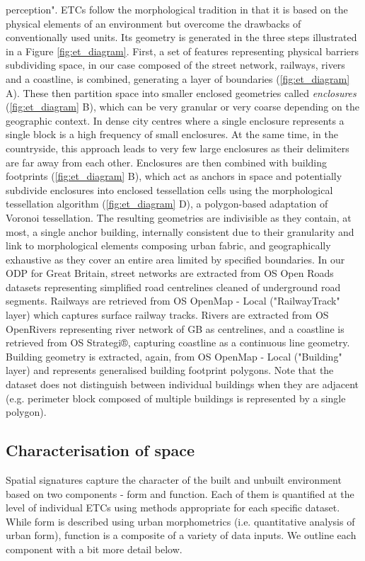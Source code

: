 \documentclass[fleqn,10pt]{wlscirep}
\begin{document}
perception"\cite{dab_mf_2021a}.
ETCs follow the morphological tradition in that it is
based on the physical elements of an environment but overcome the drawbacks of
conventionally used units. Its geometry is generated in the three steps illustrated in a
Figure \ref{fig:et_diagram}. First, a set of features representing physical barriers
subdividing space, in our case composed of the street network, railways, rivers and a
coastline, is combined, generating a layer of boundaries (\ref{fig:et_diagram} A).
These then partition space
into smaller enclosed geometries called \textit{enclosures} (\ref{fig:et_diagram} B),
which can be very granular
or very coarse depending on the geographic context. In dense city centres where a single
enclosure represents a single block is a high frequency of small enclosures. At the same time, in the
countryside, this approach leads to very few large enclosures as their delimiters are far away
from each other. Enclosures are then combined with building footprints (\ref{fig:et_diagram} B),
which act as
anchors in space and potentially subdivide enclosures into enclosed tessellation cells using the
morphological tessellation algorithm\cite{fleischmann2020} (\ref{fig:et_diagram} D),
a polygon-based adaptation of Voronoi
tessellation. The resulting geometries are indivisible as they contain, at most, a single
anchor building, internally consistent due to their granularity and link to morphological
elements composing urban fabric, and geographically exhaustive as they cover an entire area
limited by specified boundaries.
In our ODP for Great Britain, street networks are extracted from OS
Open Roads datasets\cite{openroads2020} representing simplified road centrelines
cleaned of underground road segments.
Railways are retrieved from OS OpenMap - Local\cite{openmap2020}
("RailwayTrack" layer) which captures surface railway tracks. Rivers are extracted from
OS OpenRivers\cite{openrivers2020} representing river network of GB as centrelines, and a coastline is
retrieved from OS Strategi®\cite{strategi2016}, capturing coastline as a continuous line
geometry. Building geometry is extracted, again, from OS OpenMap - Local ("Building"
layer) and represents generalised building footprint polygons. Note that the dataset
does not distinguish between individual buildings when they are adjacent (e.g. perimeter
block composed of multiple buildings is represented by a single polygon).
\subsection*{Characterisation of space}
Spatial signatures capture the character of the built and unbuilt environment
based on two components - form and function. Each of them is quantified at the level of
individual ETCs using methods appropriate for each specific dataset. While form
is described using urban morphometrics (i.e. quantitative analysis of urban
form)\cite{dibble2019origin}, function is a composite of a variety of data inputs. We outline each
component with a bit more detail below.
\end{document}
